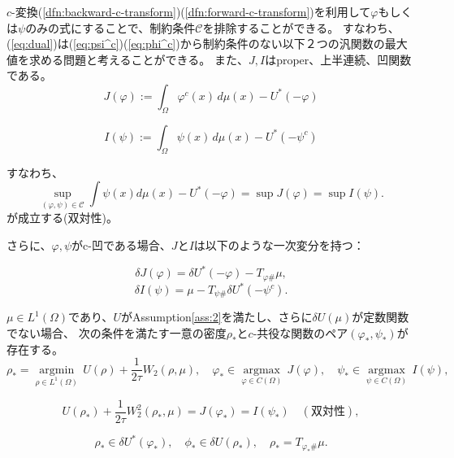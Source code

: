 $c$-変換(\ref{dfn:backward-c-transform})(\ref{dfn:forward-c-transform})を利用して$\varphi$もしくは$\psi$のみの式にすることで、制約条件$\mathcal{C}$を排除することができる。
すなわち、(\ref{eq:dual})は(\ref{eq:psi^c})(\ref{eq:phi^c})から制約条件のない以下２つの汎関数の最大値を求める問題と考えることができる。
また、$J,I$はproper、上半連続、凹関数である。
\begin{equation}
    \label{eq:J}
    J(\varphi):= \int_{\Omega} \varphi^c(x) \,d\mu(x) - U^*(- \varphi)
\end{equation}

\begin{equation}
    \label{eq:I}
    I(\psi):= \int_{\Omega} \psi(x) \, d\mu(x) - U^*(- \psi^{c})
\end{equation}

すなわち、
\[
\sup_{(\varphi,\psi) \in \mathcal{C}} \int \psi(x) d\mu(x) - U^*(- \varphi) = \sup J(\varphi) = \sup I(\psi).
\]
が成立する(双対性)。

さらに、$\varphi, \psi$がc-凹である場合、$J$と$I$は以下のような一次変分を持つ：

\begin{equation}
    \label{eq:delta J}
    \delta J(\varphi) = \delta U^*(- \varphi) - T_{\varphi \#} \mu,
\end{equation}
\begin{equation}
    \label{eq:delta I}
    \delta I(\psi) = \mu - T_{\psi \#} \delta U^* (- \psi^c).
\end{equation}

\begin{thm}
    \label{thm: duality}
        $\mu \in L^1(\Omega)$であり、$U$がAssumption\ref{ass:2}を満たし、さらに$\delta U(\mu)$が定数関数でない場合、
        次の条件を満たす一意の密度$\rho_*$と$c$-共役な関数のペア$(\varphi_*, \psi_*)$が存在する。
    \begin{equation*}
        \rho_* = \underset{\rho \in L^1(\Omega)} {\operatorname{argmin}} \, U(\rho) + \frac{1}{2\tau} W_2(\rho, \mu), \quad \varphi_* \in \underset{\varphi \in C(\Omega)} {\operatorname{argmax}} \, J(\varphi), \quad \psi_* \in \underset{\psi \in C(\Omega)} {\operatorname{argmax}} \, I(\psi),
    \end{equation*}
    
    \begin{equation*}
    U(\rho_*) + \frac{1}{2\tau} W_2^2(\rho_*,\mu) = J(\varphi_*) = I(\psi_*) \quad (\text{双対性}), 
    \end{equation*}
    
    \begin{equation*}
        \rho_* \in \delta U^*(\varphi_*), \quad \phi_* \in \delta U(\rho_*), \quad \rho_* = T_{\varphi_* \#} \mu.
    \end{equation*}
    \end{thm}



